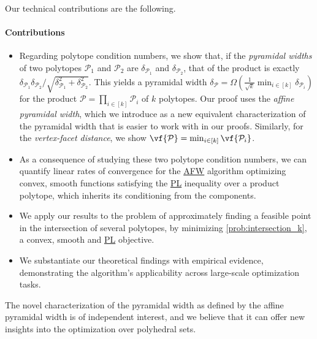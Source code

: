 \documentclass{article}
\newcommand{\bigomega}[1]{\Omega( #1 )}
\newcommand{\mP}{\mathcal{P}}
\newcommand\newlink[2]{\hyperlink{#1}{\normalcolor #2}}
\newcommand{\PL}{\newlink{def:acronym_polyak_lojasiewicz}{PL}}
\newcommand{\AFW}{\newlink{def:acronym_away_frank_wolfe}{AFW}}
\begin{document}
Our technical contributions are the following.

\paragraph{Contributions}
\begin{itemize}
    \item Regarding polytope condition numbers, we show that, if the \textit{pyramidal widths} of two polytopes $\mathcal{P}_1$ and $\mathcal{P}_2$ are $\delta_{\mathcal{P}_1}$ and $\delta_{\mathcal{P}_2}$, that of the product is exactly $\delta_{\mathcal{P}_1} \delta_{\mathcal{P}_2} /\sqrt{\delta_{\mathcal{P}_1}^2 + \delta_{\mathcal{P}_2}^2}$. This yields a pyramidal width $\delta_\mathcal{P} = \bigomega{\frac{1}{\sqrt{k}}\min_{i\in[k]} \delta_{\mathcal{P}_i}}$ for the product $\mathcal{P} = \prod_{i\in[k]} \mathcal{P}_i$ of $k$ polytopes. Our proof uses the \textit{affine pyramidal width}, which we introduce as a new equivalent characterization of the pyramidal width that is easier to work with in our proofs. Similarly, for the \textit{vertex-facet distance}, we show $\vf{\mP} = \min_{i\in[k]} \vf{\mP_{i}}$.

   \item As a consequence of studying these two polytope condition numbers, we can quantify linear rates of convergence for the \AFW{} algorithm optimizing convex, smooth functions satisfying the \PL{} inequality over a product polytope, which inherits its conditioning from the components.
   \item We apply our results to the problem of approximately finding a feasible point in the intersection of several polytopes, by minimizing \eqref{prob:intersection_k}, a convex, smooth and \PL{} objective.
   \item We substantiate our theoretical findings with empirical evidence, demonstrating the algorithm's applicability across large-scale optimization tasks.
\end{itemize}

The novel characterization of the pyramidal width as defined by the affine pyramidal width is of independent interest, and we believe that it can offer new insights into the optimization over polyhedral sets.
\end{document}
